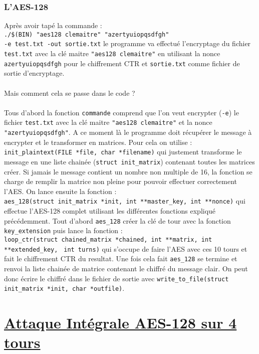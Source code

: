 \documentclass[french, 12pt]{article}
\begin{document}
	\section{L'AES-128}
	Après avoir tapé la commande : \\
	 \verb|./$(BIN) "aes128 clemaitre" "azertyuiopqsdfgh"|\\
	 \verb|-e test.txt -out sortie.txt|
	 le programme va effectué l'encryptage du fichier \verb|test.txt| avec la clé maitre \verb|"aes128 clemaitre"| en utilisant la nonce \verb|azertyuiopqsdfgh| pour le chiffrement CTR et \verb|sortie.txt| comme fichier de sortie d'encryptage.
	 \\\\
	 Mais comment cela se passe dans le code ?
	 \\\\
	 Tous d'abord la fonction \verb|commande| comprend que l'on veut encrypter (\verb|-e|) le fichier \verb|test.txt| avec la clé maitre \verb|"aes128 clemaitre"| et la nonce \verb|"azertyuiopqsdfgh"|. A ce moment là le programme doit récupérer le message à encrypter et le transformer en matrices. Pour cela on utilise : \verb|init_plaintext(FILE *file, char *filename)| qui justement transforme le message en une liste chainée (\verb|struct init_matrix|) contenant toutes les matrices créer. Si jamais le message contient un nombre non multiple de 16, la fonction se charge de remplir la matrice non pleine pour pouvoir effectuer correctement l'AES.
	 On lance ensuite la fonction :\\ \verb|aes_128(struct init_matrix *init, int **master_key, int **nonce)| qui effectue l'AES-128 complet utilisant les différentes fonctions expliqué précédemment. Tout d'abord \verb|aes_128| créer la clé de tour avec la fonction \verb|key_extension| puis lance la fonction : \\ \verb|loop_ctr(struct chained_matrix *chained, int **matrix, int **extended_key,|
	 \verb| int turns)| qui s'occupe de faire l'AES avec ces 10 tours et fait le chiffrement CTR du resultat.
	 Une fois cela fait \verb|aes_128| se termine et renvoi la liste chainée de matrice contenant le chiffré du message clair. On peut donc écrire le chiffré dans le fichier de sortie avec \verb|write_to_file(struct init_matrix *init, char *outfile)|.
	
	\part{\underline{Attaque Intégrale AES-128 sur 4 tours}}
	
	
	
\end{document}
